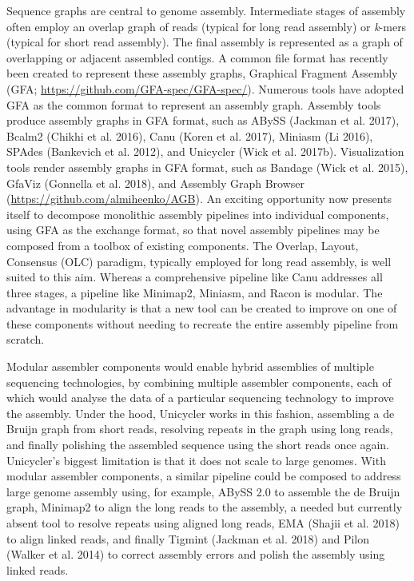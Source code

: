 \documentclass[
  12pt,
  oneside,
  openany]{book}
\begin{document}
Sequence graphs are central to genome assembly. Intermediate stages of assembly often employ an overlap graph of reads (typical for long read assembly) or \emph{k}-mers (typical for short read assembly). The final assembly is represented as a graph of overlapping or adjacent assembled contigs. A common file format has recently been created to represent these assembly graphs, Graphical Fragment Assembly (GFA; \url{https://github.com/GFA-spec/GFA-spec/}). Numerous tools have adopted GFA as the common format to represent an assembly graph. Assembly tools produce assembly graphs in GFA format, such as ABySS (Jackman et al. 2017), Bcalm2 (Chikhi et al. 2016), Canu (Koren et al. 2017), Miniasm (Li 2016), SPAdes (Bankevich et al. 2012), and Unicycler (Wick et al. 2017b). Visualization tools render assembly graphs in GFA format, such as Bandage (Wick et al. 2015), GfaViz (Gonnella et al. 2018), and Assembly Graph Browser (\url{https://github.com/almiheenko/AGB}). An exciting opportunity now presents itself to decompose monolithic assembly pipelines into individual components, using GFA as the exchange format, so that novel assembly pipelines may be composed from a toolbox of existing components. The Overlap, Layout, Consensus (OLC) paradigm, typically employed for long read assembly, is well suited to this aim. Whereas a comprehensive pipeline like Canu addresses all three stages, a pipeline like Minimap2, Miniasm, and Racon is modular. The advantage in modularity is that a new tool can be created to improve on one of these components without needing to recreate the entire assembly pipeline from scratch.

Modular assembler components would enable hybrid assemblies of multiple sequencing technologies, by combining multiple assembler components, each of which would analyse the data of a particular sequencing technology to improve the assembly. Under the hood, Unicycler works in this fashion, assembling a de Bruijn graph from short reads, resolving repeats in the graph using long reads, and finally polishing the assembled sequence using the short reads once again. Unicycler's biggest limitation is that it does not scale to large genomes. With modular assembler components, a similar pipeline could be composed to address large genome assembly using, for example, ABySS 2.0 to assemble the de Bruijn graph, Minimap2 to align the long reads to the assembly, a needed but currently absent tool to resolve repeats using aligned long reads, EMA (Shajii et al. 2018) to align linked reads, and finally Tigmint (Jackman et al. 2018) and Pilon (Walker et al. 2014) to correct assembly errors and polish the assembly using linked reads.
\end{document}
